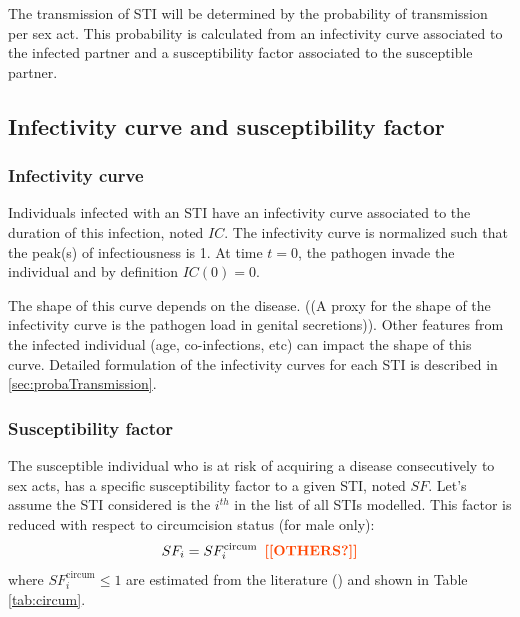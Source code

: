 \documentclass[11pt, onecolumn]{article}
\newcommand{\warning}[1]{\textbf{\textcolor{OrangeRed}{#1}}}
\begin{document}
The transmission of STI will be determined by the probability of transmission per sex act. This probability is calculated from an infectivity curve associated to the infected partner and a susceptibility factor associated to the susceptible partner.

\subsection{Infectivity curve and susceptibility factor}

\subsubsection*{Infectivity curve}
Individuals infected with an STI have an infectivity curve associated to the duration of this infection, noted $IC$. The infectivity curve is normalized such that the peak(s) of infectiousness is 1. At time $t=0$, the pathogen invade the individual and by definition $IC(0)=0$.

The shape of this curve depends on the disease. ((A proxy for the shape of the infectivity curve is the pathogen load in genital secretions)). Other features from the infected individual (age, co-infections, etc) can impact the shape of this curve. Detailed formulation of the infectivity curves for each STI is described in \ref{sec:probaTransmission}.

\subsubsection*{Susceptibility factor}
The susceptible individual who is at risk of acquiring a disease consecutively to sex acts, has a specific susceptibility factor to a given STI, noted $SF$. Let's assume the STI considered is the $i^{th}$ in the list of all STIs modelled. This factor is reduced with respect to circumcision status (for male only):
$$SF_i =SF_i^{\mathrm{circum}}  \,\,\, \warning{[[OTHERS?]]}$$
where $SF_i^{\mathrm{circum}}\leq 1$ are estimated from the literature (\cite{Weiss:2006hoa,Tobian:2009kp,Tobian:2010tr}) and shown in Table \ref{tab:circum}.
\end{document}
